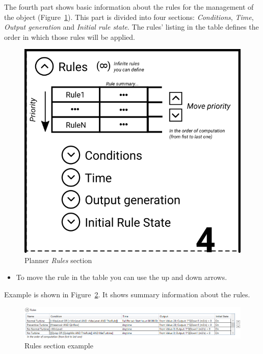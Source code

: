\documentclass[
  letterpaper,
  DIV=11,
  numbers=noendperiod]{scrreprt}
\providecommand{\tightlist}{%
  \setlength{\itemsep}{0pt}\setlength{\parskip}{0pt}}\usepackage{longtable,booktabs,array}
\begin{document}
The fourth part shows basic information about the rules for the
management of the object (Figure~\ref{fig-planner_rules_section}). This
part is divided into four sections: \emph{Conditions}, \emph{Time},
\emph{Output generation} and \emph{Initial rule state}. The rules'
listing in the table defines the order in which those rules will be
applied.

\begin{figure}

{\centering \includegraphics{./figures/fig-planner_rules_section.png}

}

\caption{\label{fig-planner_rules_section}Planner \emph{Rules} section}

\end{figure}

\begin{itemize}
\tightlist
\item
  {To move the rule in the table you can use the up and down arrows.}
\end{itemize}

Example is shown in Figure~\ref{fig-planner_rules_section_example}. It
shows summary information about the rules.

\begin{figure}

{\centering \includegraphics{./figures/fig-planner_rules_section_example.png}

}

\caption{\label{fig-planner_rules_section_example}Rules section example}

\end{figure}
\end{document}

